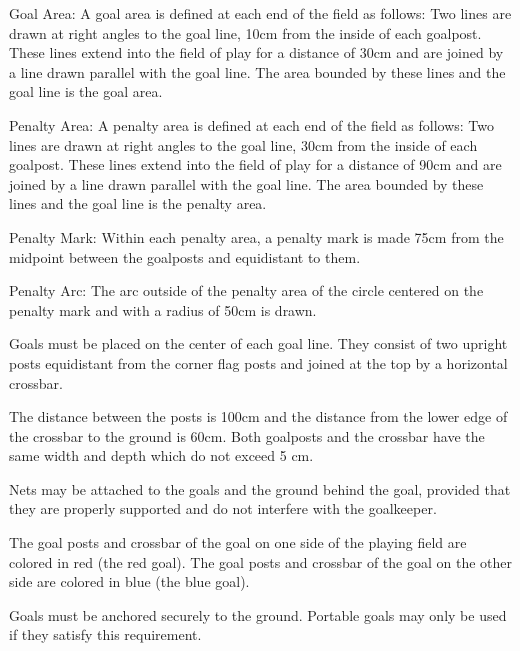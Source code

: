 \documentclass[12pt]{hurocup}
\begin{document}
\begin{lawlist}[US]
\item Goal Area: A goal area is defined at each end of the field as
  follows: Two lines are drawn at right angles to the goal line, 10cm
  from the inside of each goalpost. These lines extend into the field
  of play for a distance of 30cm and are joined by a line drawn
  parallel with the goal line. The area bounded by these lines and the
  goal line is the goal area.
  
\item Penalty Area: A penalty area is defined at each end of the field
  as follows: Two lines are drawn at right angles to the goal line,
  30cm from the inside of each goalpost. These lines extend into the
  field of play for a distance of 90cm and are joined by a line drawn
  parallel with the goal line. The area bounded by these lines and the
  goal line is the penalty area.
  
\item \label{penalty-mark} Penalty Mark: Within each penalty area, a
  penalty mark is made 75cm from the midpoint between the goalposts
  and equidistant to them.
  
\item \label{penalty-arc} Penalty Arc: The arc outside of the penalty
  area of the circle centered on the penalty mark and with a radius of
  50cm is drawn.

\item Goals must be placed on the center of each goal line. They
  consist of two upright posts equidistant from the corner flag posts
  and joined at the top by a horizontal crossbar.
  
\item The distance between the posts is 100cm and the distance from
  the lower edge of the crossbar to the ground is 60cm. Both goalposts
  and the crossbar have the same width and depth which do not exceed 5
  cm.
  
\item Nets may be attached to the goals and the ground behind the
  goal, provided that they are properly supported and do not interfere
  with the goalkeeper.
  
\item The goal posts and crossbar of the goal on one side of the
  playing field are colored in red (the red goal).
  The goal posts and crossbar of the goal on the other side are
  colored in blue (the blue goal).
  
\item Goals must be anchored securely to the ground. Portable goals
  may only be used if they satisfy this requirement.

\end{lawlist}
\end{document}
